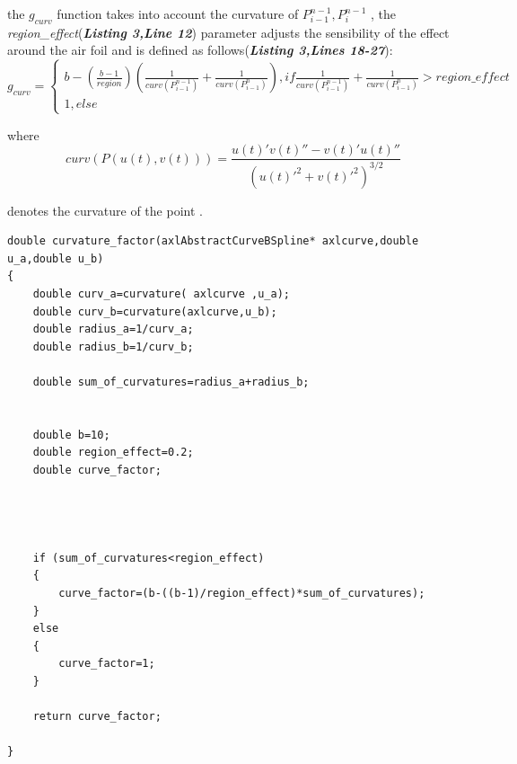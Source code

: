 \documentclass[12pt,a4paper]{article}
\begin{document}
the $g_{curv}$ function takes into account the curvature of $P_{i-1}^{n-1},P_{i}^{n-1}$ , the \textit{region\_{effect}}(\textbf{\textit{Listing 3,Line 12}}) parameter adjusts the sensibility of the effect around the air foil and is defined as follows(\textbf{\textit{Listing 3,Lines 18-27}}):\\
 

$$ g_{curv}=\begin{cases} b-(\frac{b-1}{region})\left(  \frac{1}{curv(P_{i-1}^{n-1})}+\frac{1}{curv(P_{i-1}^{n})}\right) ,if \frac{1}{curv(P_{i-1}^{n-1})}+\frac{1}{curv(P_{i-1}^{n})} >region\_{effect} \\ 1, else \end{cases} $$


where $$curv(P(u(t),v(t)))=\frac{u(t)'v(t)''-v(t)'u(t)''}{(u(t)'^2+v(t)'^2)^{3/2}}$$

denotes the curvature of the point .
 
 \begin{lstlisting}[label=some-code,caption=curvature factor]
double curvature_factor(axlAbstractCurveBSpline* axlcurve,double u_a,double u_b)
{   
    double curv_a=curvature( axlcurve ,u_a);
    double curv_b=curvature(axlcurve,u_b);
    double radius_a=1/curv_a;
    double radius_b=1/curv_b;
 
    double sum_of_curvatures=radius_a+radius_b;


    double b=10;
    double region_effect=0.2;
    double curve_factor;




    if (sum_of_curvatures<region_effect)
    {
        curve_factor=(b-((b-1)/region_effect)*sum_of_curvatures);
    }
    else
    {
        curve_factor=1;
    }

    return curve_factor;

}


\end{lstlisting}

 
\end{document}
